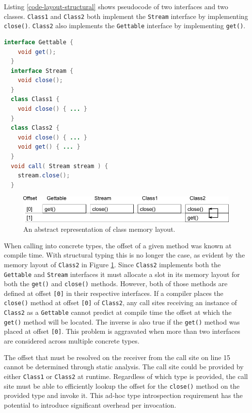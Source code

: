 Listing \ref{code-layout-structural} shows pseudocode of two interfaces and two classes.  \texttt{Class1} and \texttt{Class2} both implement the \texttt{Stream} interface by implementing \texttt{close()}.  \texttt{Class2} also implements the \texttt{Gettable} interface by implementing \texttt{get()}.

\begin{lstlisting}[language=Java,caption=Pseudocode: Java with structural types,label=code-layout-structural]
  interface Gettable {
    void get();
  }
  interface Stream {
    void close();
  }
  class Class1 {
    void close() { ... }
  }
  class Class2 {
    void close() { ... }
    void get() { ... }
  }
  void call( Stream stream ) {
    stream.close();
  }
\end{lstlisting}

\begin{figure}[htbp]
  \centering
    \includegraphics[width=\textwidth]{./Figures/memory-layout-structural.pdf}
  \caption[Structural Inheritance Layout]{An abstract representation of class memory layout.}
	\label{fig:memory-layout-structural}
\end{figure}

When calling into concrete types, the offset of a given method was known at compile time.  With structural typing this is no longer the case, as evident by the memory layout of \texttt{Class2} in Figure \ref{fig:memory-layout-structural}.  Since \texttt{Class2} implements both the \texttt{Gettable} and \texttt{Stream} interfaces it must allocate a slot in its memory layout for both the \texttt{get()} and \texttt{close()} methods.  However, both of those methods are defined at offset \texttt{[0]} in their respective interfaces.  If a compiler places the \texttt{close()} method at offset \texttt{[0]} of \texttt{Class2}, any call sites receiving an instance of \texttt{Class2} as a \texttt{Gettable} cannot predict at compile time the offset at which the \texttt{get()} method will be located.  The inverse is also true if the \texttt{get()} method was placed at offset \texttt{[0]}.  This problem is aggravated when more than two interfaces are considered across multiple concrete types.

The offset that must be resolved on the receiver from the call site on line 15 cannot be determined through static analysis.  The call site could be provided by either \texttt{Class1} or \texttt{Class2} at runtime.  Regardless of which type is provided, the call site must be able to efficiently lookup the offset for the \texttt{close()} method on the provided type and invoke it.  This ad-hoc type introspection requirement has the potential to introduce significant overhead per invocation.

